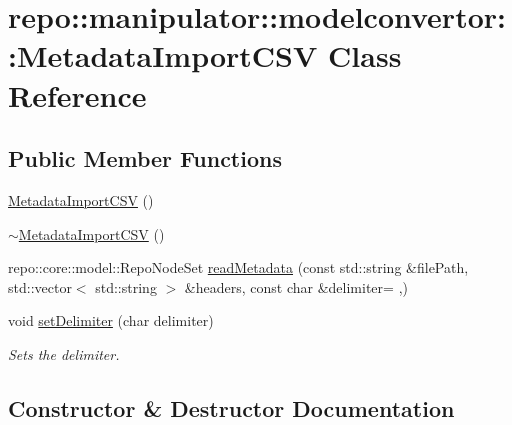 \hypertarget{classrepo_1_1manipulator_1_1modelconvertor_1_1_metadata_import_c_s_v}{}\section{repo\+:\+:manipulator\+:\+:modelconvertor\+:\+:Metadata\+Import\+C\+S\+V Class Reference}
\label{classrepo_1_1manipulator_1_1modelconvertor_1_1_metadata_import_c_s_v}
\subsection*{Public Member Functions}
\begin{DoxyCompactItemize}
\item 
\hyperlink{classrepo_1_1manipulator_1_1modelconvertor_1_1_metadata_import_c_s_v_a63c5071bd81c7a8083880ab577e25c4d}{Metadata\+Import\+C\+S\+V} ()
\item 
\hyperlink{classrepo_1_1manipulator_1_1modelconvertor_1_1_metadata_import_c_s_v_a898d8ae4b1c838acea1c09b48b75950a}{$\sim$\+Metadata\+Import\+C\+S\+V} ()
\item 
repo\+::core\+::model\+::\+Repo\+Node\+Set \hyperlink{classrepo_1_1manipulator_1_1modelconvertor_1_1_metadata_import_c_s_v_a03e0362b0ef3042d69a1aa66532f95d8}{read\+Metadata} (const std\+::string \&file\+Path, std\+::vector$<$ std\+::string $>$ \&headers, const char \&delimiter= \textquotesingle{},\textquotesingle{})
\item 
\hypertarget{classrepo_1_1manipulator_1_1modelconvertor_1_1_metadata_import_c_s_v_a8b63962e4f9db61318ff397a3a185ab0}{}void \hyperlink{classrepo_1_1manipulator_1_1modelconvertor_1_1_metadata_import_c_s_v_a8b63962e4f9db61318ff397a3a185ab0}{set\+Delimiter} (char delimiter)\label{classrepo_1_1manipulator_1_1modelconvertor_1_1_metadata_import_c_s_v_a8b63962e4f9db61318ff397a3a185ab0}

\begin{DoxyCompactList}\small\item\em Sets the delimiter. \end{DoxyCompactList}\end{DoxyCompactItemize}


\subsection{Constructor \& Destructor Documentation}
\hypertarget{classrepo_1_1manipulator_1_1modelconvertor_1_1_metadata_import_c_s_v_a63c5071bd81c7a8083880ab577e25c4d}{}
